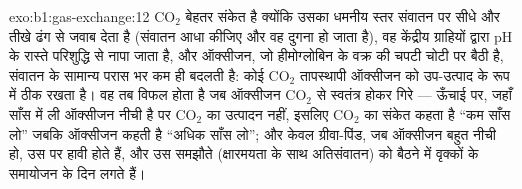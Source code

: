 \begin{solution}{exo:b1:gas-exchange:12}
$\mathrm{CO_2}$ बेहतर संकेत है क्योंकि उसका धमनीय स्तर संवातन पर सीधे
और तीखे ढंग से जवाब देता है (संवातन आधा कीजिए और वह दुगना हो जाता
है), वह केंद्रीय ग्राहियों द्वारा pH के रास्ते परिशुद्धि से नापा जाता है,
और ऑक्सीजन, जो हीमोग्लोबिन के वक्र की चपटी चोटी पर बैठी है, संवातन के
सामान्य परास भर कम ही बदलती है: कोई $\mathrm{CO_2}$ तापस्थापी ऑक्सीजन को
उप-उत्पाद के रूप में ठीक रखता है। वह तब विफल होता है जब ऑक्सीजन
$\mathrm{CO_2}$ से स्वतंत्र होकर गिरे --- ऊँचाई पर,
जहाँ साँस में ली ऑक्सीजन नीची है पर $\mathrm{CO_2}$ का उत्पादन नहीं,
इसलिए $\mathrm{CO_2}$ का संकेत कहता है ``कम साँस लो'' जबकि ऑक्सीजन कहती है
``अधिक साँस लो''; और केवल ग्रीवा-पिंड, जब ऑक्सीजन बहुत नीची हो, उस पर
हावी होते हैं, और उस समझौते (क्षारमयता के साथ अतिसंवातन) को बैठने में
वृक्कों के समायोजन के दिन लगते हैं।
\end{solution}

